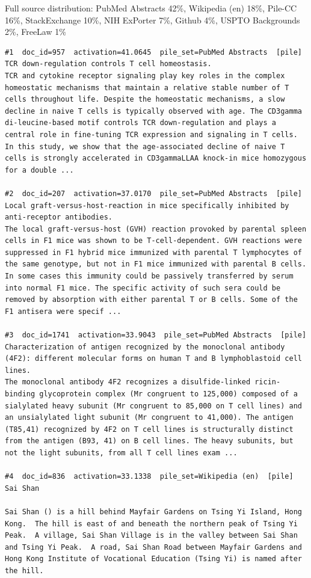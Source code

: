 Full source distribution: PubMed Abstracts 42\%, Wikipedia (en) 18\%, Pile-CC 16\%, StackExchange 10\%, NIH ExPorter 7\%, Github 4\%, USPTO Backgrounds 2\%, FreeLaw 1\%

\begin{verbatim}
#1  doc_id=957  activation=41.0645  pile_set=PubMed Abstracts  [pile]
TCR down-regulation controls T cell homeostasis.
TCR and cytokine receptor signaling play key roles in the complex homeostatic mechanisms that maintain a relative stable number of T cells throughout life. Despite the homeostatic mechanisms, a slow decline in naive T cells is typically observed with age. The CD3gamma di-leucine-based motif controls TCR down-regulation and plays a central role in fine-tuning TCR expression and signaling in T cells. In this study, we show that the age-associated decline of naive T cells is strongly accelerated in CD3gammaLLAA knock-in mice homozygous for a double ...

#2  doc_id=207  activation=37.0170  pile_set=PubMed Abstracts  [pile]
Local graft-versus-host-reaction in mice specifically inhibited by anti-receptor antibodies.
The local graft-versus-host (GVH) reaction provoked by parental spleen cells in F1 mice was shown to be T-cell-dependent. GVH reactions were suppressed in F1 hybrid mice immunized with parental T lymphocytes of the same genotype, but not in F1 mice immunized with parental B cells. In some cases this immunity could be passively transferred by serum into normal F1 mice. The specific activity of such sera could be removed by absorption with either parental T or B cells. Some of the F1 antisera were specif ...

#3  doc_id=1741  activation=33.9043  pile_set=PubMed Abstracts  [pile]
Characterization of antigen recognized by the monoclonal antibody (4F2): different molecular forms on human T and B lymphoblastoid cell lines.
The monoclonal antibody 4F2 recognizes a disulfide-linked ricin-binding glycoprotein complex (Mr congruent to 125,000) composed of a sialylated heavy subunit (Mr congruent to 85,000 on T cell lines) and an unsialylated light subunit (Mr congruent to 41,000). The antigen (T85,41) recognized by 4F2 on T cell lines is structurally distinct from the antigen (B93, 41) on B cell lines. The heavy subunits, but not the light subunits, from all T cell lines exam ...

#4  doc_id=836  activation=33.1338  pile_set=Wikipedia (en)  [pile]
Sai Shan

Sai Shan () is a hill behind Mayfair Gardens on Tsing Yi Island, Hong Kong.  The hill is east of and beneath the northern peak of Tsing Yi Peak.  A village, Sai Shan Village is in the valley between Sai Shan and Tsing Yi Peak.  A road, Sai Shan Road between Mayfair Gardens and Hong Kong Institute of Vocational Education (Tsing Yi) is named after the hill.


\end{verbatim}
